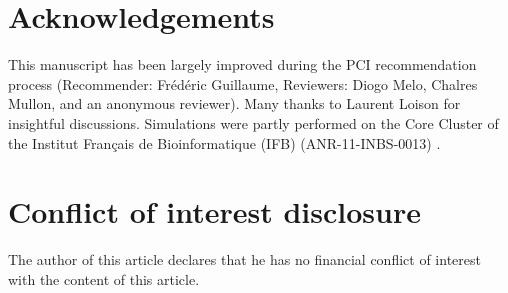 \documentclass[10pt,a4paper]{article}
\begin{document}
\section*{Acknowledgements}

This manuscript has been largely improved during the PCI recommendation process (Recommender: Frédéric Guillaume, Reviewers: Diogo Melo, Chalres Mullon, and an anonymous reviewer). Many thanks to Laurent Loison for insightful discussions. Simulations were partly performed on the Core Cluster of the Institut Français de Bioinformatique (IFB) (ANR-11-INBS-0013) .

\section*{Conflict of interest disclosure}

The author of this article declares that he has no financial conflict of interest with the content of this article.

\printbibliography

\clearpage
\end{document}
